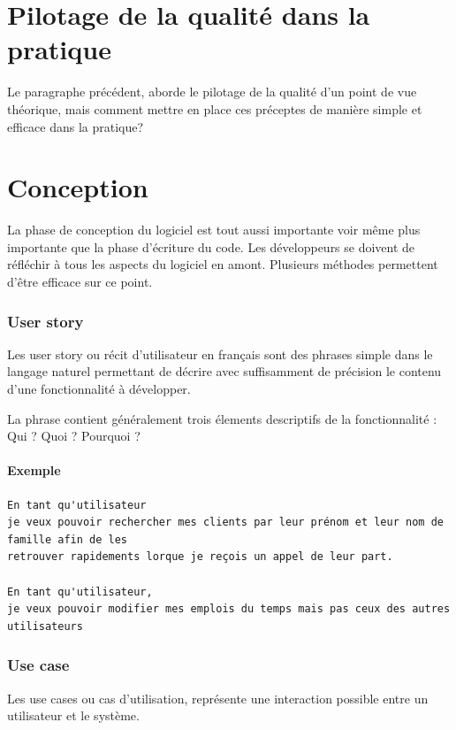 \section{Pilotage de la qualité dans la pratique}

Le paragraphe précédent, aborde le pilotage de la qualité d'un point de vue théorique, mais comment mettre en place ces préceptes de manière simple et efficace dans la pratique?

\section{Conception}

La phase de conception du logiciel est tout aussi importante voir même plus importante que la phase d'écriture du code. 
Les développeurs se doivent de réfléchir à tous les aspects du logiciel en amont. 
Plusieurs méthodes permettent d'être efficace sur ce point. 

\subsubsection{User story}
Les user story ou récit d'utilisateur en français sont des phrases simple dans le langage naturel permettant de décrire avec suffisamment de précision le contenu d'une fonctionnalité à développer. 

La phrase contient généralement trois élements descriptifs de la fonctionnalité : Qui ? Quoi ? Pourquoi ? 

\paragraph{Exemple}

\begin{verbatim}
En tant qu'utilisateur
je veux pouvoir rechercher mes clients par leur prénom et leur nom de famille afin de les
retrouver rapidements lorque je reçois un appel de leur part. 

En tant qu'utilisateur,
je veux pouvoir modifier mes emplois du temps mais pas ceux des autres utilisateurs
\end{verbatim}

\subsubsection{Use case}
Les use cases ou cas d'utilisation, représente une interaction possible entre un utilisateur et le système. 


